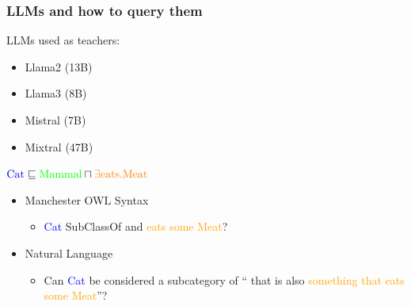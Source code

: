 \documentclass[handout]{beamer}\mode<handout>{\usetheme{AMSBolognaFC}}
\begin{document}
\begin{frame}[c,allowframebreaks]
\frametitle{LLMs and how to query them}

    LLMs used as teachers:

    \begin{itemize}
        \item Llama2 (13B)
        \item Llama3 (8B)
        \item Mistral (7B)
        \item Mixtral (47B)
    \end{itemize}

    \vspace{1cm}

    $\textcolor{blue}{\text{Cat}} \sqsubseteq \textcolor{green}{\text{Mammal}} \sqcap \textcolor{orange}{\exists \text{eats.Meat}}$

    \begin{itemize}
        \item Manchester OWL Syntax
        \begin{itemize}
            \item \textcolor{blue}{Cat} SubClassOf \textcolor{green}{} and \textcolor{orange}{eats some Meat}?
        \end{itemize}
        \item Natural Language
        \begin{itemize}
            \item Can \textcolor{blue}{Cat} be considered a subcategory of ``\textcolor{green}{} that is also \textcolor{orange}{something that eats some Meat}''?
        \end{itemize}
    \end{itemize}

    \framebreak


\end{frame}
\end{document}
